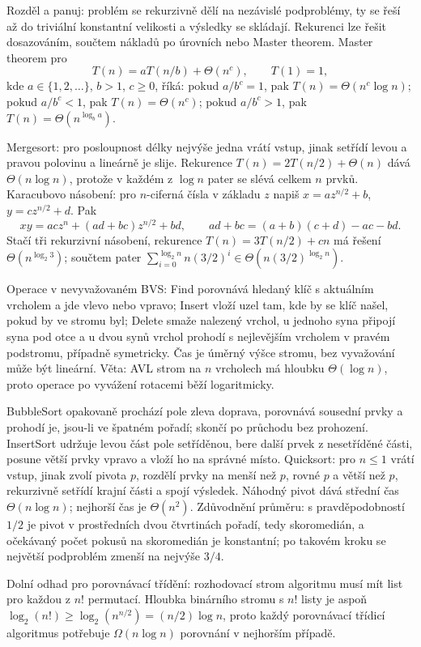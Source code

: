 \begin{odpoved}
Rozděl a panuj: problém se rekurzivně dělí na nezávislé podproblémy, ty se řeší až do
triviální konstantní velikosti a výsledky se skládají. Rekurenci lze řešit dosazováním,
součtem nákladů po úrovních nebo Master theorem. Master theorem pro
\[
T(n)=aT(n/b)+\Theta(n^c),\qquad T(1)=1,
\]
kde $a\in\{1,2,\ldots\}$, $b>1$, $c\ge0$, říká:
pokud $a/b^c=1$, pak $T(n)=\Theta(n^c\log n)$; pokud $a/b^c<1$, pak
$T(n)=\Theta(n^c)$; pokud $a/b^c>1$, pak $T(n)=\Theta(n^{\log_b a})$.

Mergesort: pro posloupnost délky nejvýše jedna vrátí vstup, jinak setřídí levou a pravou
polovinu a lineárně je slije. Rekurence $T(n)=2T(n/2)+\Theta(n)$ dává
$\Theta(n\log n)$, protože v každém z $\log n$ pater se slévá celkem $n$ prvků.
Karacubovo násobení: pro $n$-ciferná čísla v základu $z$ napiš
$x=az^{n/2}+b$, $y=cz^{n/2}+d$. Pak
\[
xy=ac z^n+(ad+bc)z^{n/2}+bd,\qquad
ad+bc=(a+b)(c+d)-ac-bd.
\]
Stačí tři rekurzivní násobení, rekurence $T(n)=3T(n/2)+cn$ má řešení
$\Theta(n^{\log_2 3})$; součtem pater
$\sum_{i=0}^{\log_2 n} n(3/2)^i\in\Theta(n(3/2)^{\log_2 n})$.

Operace v nevyvažovaném BVS: Find porovnává hledaný klíč s aktuálním vrcholem a jde
vlevo nebo vpravo; Insert vloží uzel tam, kde by se klíč našel, pokud by ve stromu byl;
Delete smaže nalezený vrchol, u jednoho syna připojí syna pod otce a u dvou synů vrchol
prohodí s nejlevějším vrcholem v pravém podstromu, případně symetricky. Čas je
úměrný výšce stromu, bez vyvažování může být lineární. Věta: AVL strom na $n$ vrcholech
má hloubku $\Theta(\log n)$, proto operace po vyvážení rotacemi běží logaritmicky.

BubbleSort opakovaně prochází pole zleva doprava, porovnává sousední prvky a prohodí je,
jsou-li ve špatném pořadí; skončí po průchodu bez prohození. InsertSort udržuje levou
část pole setříděnou, bere další prvek z nesetříděné části, posune větší prvky vpravo a
vloží ho na správné místo. Quicksort: pro $n\le1$ vrátí vstup, jinak zvolí pivota $p$,
rozdělí prvky na menší než $p$, rovné $p$ a větší než $p$, rekurzivně setřídí krajní
části a spojí výsledek. Náhodný pivot dává střední čas $\Theta(n\log n)$; nejhorší čas
je $\Theta(n^2)$. Zdůvodnění průměru: s pravděpodobností $1/2$ je pivot v prostředních
dvou čtvrtinách pořadí, tedy skoromedián, a očekávaný počet pokusů na skoromedián je
konstantní; po takovém kroku se největší podproblém zmenší na nejvýše $3/4$.

Dolní odhad pro porovnávací třídění: rozhodovací strom algoritmu musí mít list pro
každou z $n!$ permutací. Hloubka binárního stromu s $n!$ listy je aspoň
$\log_2(n!)\ge \log_2(n^{n/2})=(n/2)\log n$, proto každý porovnávací třídicí algoritmus
potřebuje $\Omega(n\log n)$ porovnání v nejhorším případě.


\end{odpoved}
